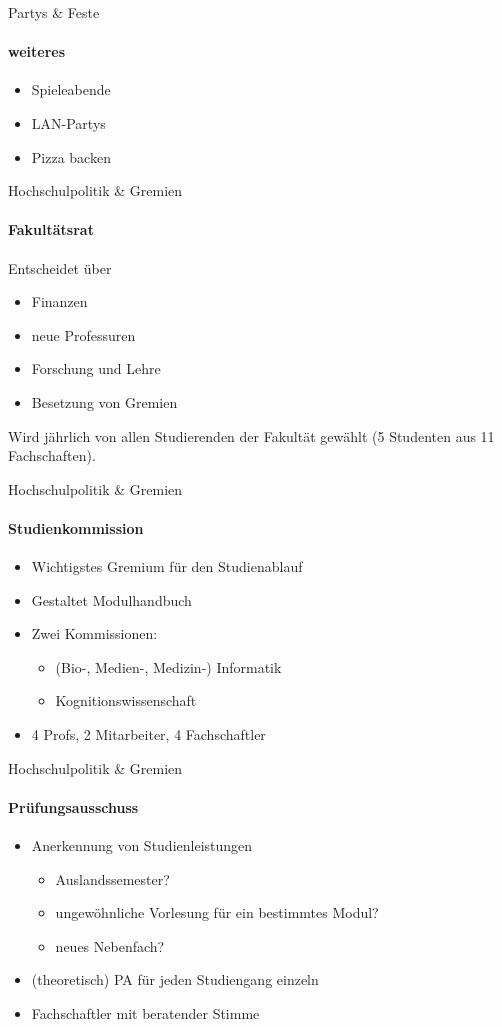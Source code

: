 \documentclass{beamer}
\begin{document}
	\begin{frame}{Partys \& Feste}
		\framesubtitle{weiteres}
		\begin{itemize}
			\item Spieleabende
			\item LAN-Partys
			\item Pizza backen
		\end{itemize}
	\end{frame}
	
	\begin{frame}{Hochschulpolitik \& Gremien}
		\framesubtitle{Fakultätsrat}
	 	Entscheidet über
	 	\begin{itemize}
	 		\item Finanzen
	 		\item neue Professuren
	 		\item Forschung und Lehre
	 		\item Besetzung von Gremien
	 	\end{itemize}
	 	Wird jährlich von allen Studierenden der Fakultät gewählt (5 Studenten aus 11 Fachschaften).
	 \end{frame}
	
	\begin{frame}{Hochschulpolitik \& Gremien}
		\framesubtitle{Studienkommission}
	 	\begin{itemize}
	 		\item Wichtigstes Gremium für den Studienablauf
	 		\item Gestaltet Modulhandbuch
	 		\item Zwei Kommissionen:
	 			\begin{itemize}
	 				\item (Bio-, Medien-, Medizin-) Informatik
	 				\item Kognitionswissenschaft
	 			\end{itemize}
	 		\item 4 Profs, 2 Mitarbeiter, 4 Fachschaftler\\
	 	\end{itemize}
	 \end{frame}
	
	\begin{frame}{Hochschulpolitik \& Gremien}
		\framesubtitle{Prüfungsausschuss}
	 	\begin{itemize}
	 		\item Anerkennung von Studienleistungen
	 			\begin{itemize}
	 				\item Auslandssemester?
	 				\item ungewöhnliche Vorlesung für ein bestimmtes Modul?
	 				\item neues Nebenfach?
	 			\end{itemize}
	 		\item (theoretisch) PA für jeden Studiengang einzeln
	 		\item Fachschaftler mit beratender Stimme
	 	\end{itemize}
	 \end{frame}
	
\end{document}
